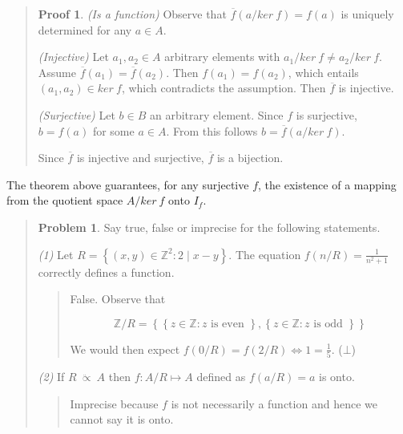 \documentclass[a4paper, 12pt]{article}
\theoremstyle{definition}
\newtheorem{problem}{Problem}
\theoremstyle{definition}
\theoremstyle{definition}
\newtheorem{pro}{Proof}
\begin{document}
\small
\begin{quote}

\begin{pro}
    
\textit{(Is a function)} Observe that $\overline{f}(a / ker ~ f) = f(a)$
is uniquely determined for any $a \in A$.

\textit{(Injective)} Let $a_1, a_2 \in A$ arbitrary elements
with $a_1 / ker ~ f \neq a_2 / ker ~ f$. Assume $\overline{f}(a_1) =
\overline{f}(a_2)$. Then $f(a_1) = f(a_2)$, which entails $(a_1, a_2) \in ker ~
f$, which contradicts the assumption. Then $\overline{f}$ is injective.

\textit{(Surjective)} Let $b \in B$ an arbitrary element. Since $f$ is
surjective, $b = f(a)$ for some $a \in A$. From this follows $b = \overline{f}(a
/ ker ~ f)$. 

Since $\overline{f}$ is injective and surjective, $\overline{f}$ is a bijection.
\end{pro} 

\end{quote}
\normalsize

The theorem above guarantees, for any surjective $f$, the existence of a mapping from the quotient space
$A / ker ~ f$ onto $I_f$.


\small
\begin{quote}

\begin{problem}
    Say true, false or imprecise for the following statements.
\end{problem}

\textit{(1)} Let $R = \left\{ (x, y) \in \mathbb{Z}^2 : 2 \mid x - y \right\} $.
The equation $f(n / R) = \frac{1}{n^2 + 1}$ correctly defines a function.

\begin{quote}
    False. Observe that 

    $$\mathbb{Z} / R =  \left\{ \left\{ z \in \mathbb{Z} : z
    \text{ is even }\right\}, \left\{ z \in \mathbb{Z} : z \text{ is odd }
\right\}   \right\} $$

We would then expect $f(0 / R) = f(2 / R) \iff 1 = \frac{1}{5}$. ($\bot$)

\end{quote}

\textit{(2)} If $R ~ \ddot{\propto} ~A$ then $f : A / R \mapsto A$ defined as
$f(a / R) = a$ is onto.

\begin{quote}
    Imprecise because $f$ is not necessarily a function and hence we cannot say
    it is onto.
\end{quote}


\end{quote}
\normalsize
\end{document}
